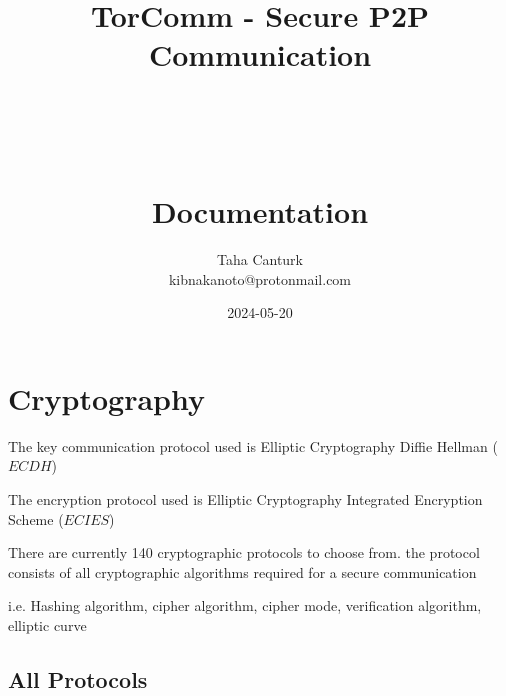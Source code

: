 \documentclass[a4paper,12pt]{article}
\title{
	\Huge TorComm - Secure P2P Communication \\
	\ \\
	\ \\
	\ \\
	\Large Documentation
}
\author{Taha Canturk\\kibnakanoto@protonmail.com}
\date{2024-05-20}
\begin{document}
\maketitle

\newpage


\newpage

\tableofcontents

\newpage


\section{Cryptography}

The key communication protocol used is Elliptic Cryptography Diffie Hellman ($ECDH$)

The encryption protocol used is Elliptic Cryptography Integrated Encryption Scheme ($ECIES$)

There are currently 140 cryptographic protocols to choose from. the protocol consists of all cryptographic algorithms required for a secure communication

i.e. Hashing algorithm, cipher algorithm, cipher mode, verification algorithm, elliptic curve

\subsection{All Protocols}

\tiny
\end{document}
